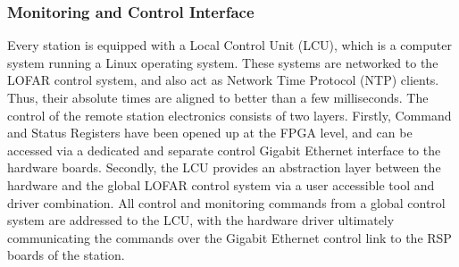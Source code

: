 \documentclass{ws-jai}
\begin{document}
\subsubsection {Monitoring and Control  Interface}
Every station is equipped  with a Local Control Unit (LCU),  which is a computer
system running  a Linux operating  system.  These  systems are networked  to the
LOFAR  control system,  and also  act as  Network Time  Protocol (NTP)  clients.
Thus, their  absolute times are aligned  to better than a  few milliseconds. The
control  of the  remote station  electronics  consists of  two layers.  Firstly,
Command and Status Registers  have been opened up at the FPGA  level, and can be
accessed via a dedicated and separate  control Gigabit Ethernet interface to the
hardware boards.  Secondly, the  LCU provides an  abstraction layer  between the
hardware and  the global  LOFAR control  system via a  user accessible  tool and
driver combination.  All  control and monitoring commands from  a global control
system  are  addressed   to  the  LCU,  with  the   hardware  driver  ultimately
communicating the  commands over the  Gigabit Ethernet  control link to  the RSP
boards of the station.


\end{document}
